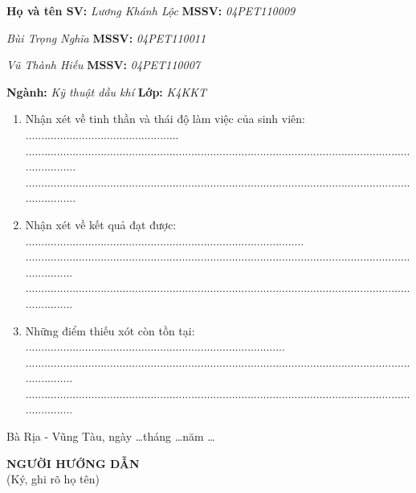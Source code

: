 \documentclass[12pt,a4paper]{article}
\begin{document}
\textbf{Họ và tên SV:} \textit{Lương Khánh Lộc} \hspace{98pt} \textbf{MSSV:} \textit{04PET110009} 

\hspace{68pt} \textit{Bùi Trọng Nghĩa} \hspace{107pt} \textbf{MSSV:} \textit{04PET110011}

\hspace{68pt} \textit{Vũ Thành Hiếu} \hspace{114pt} \textbf{MSSV:} \textit{04PET110007} \par
\textbf{Ngành:} \textit{Kỹ thuật dầu khí} \hspace{138pt} \textbf{Lớp:} \textit{K4KKT}
\begin{enumerate}
	\item Nhận xét về tinh thần và thái độ làm việc của sinh viên: .................................................\\...........................................................................................................................................\\...........................................................................................................................................
	\item Nhận xét về kết quả đạt được: .........................................................................................\\..........................................................................................................................................\\..........................................................................................................................................
	\item Những điểm thiếu xót còn tồn tại: ...................................................................................\\..........................................................................................................................................\\..........................................................................................................................................
\end{enumerate}
\begin{flushright}
Bà Rịa - Vũng Tàu, ngày \ldots tháng \ldots năm \ldots \\
\end{flushright}
\hspace{250pt} \textbf{NGƯỜI HƯỚNG DẪN}\\
\hspace*{266pt} (Ký, ghi rõ họ tên)
\end{document}
